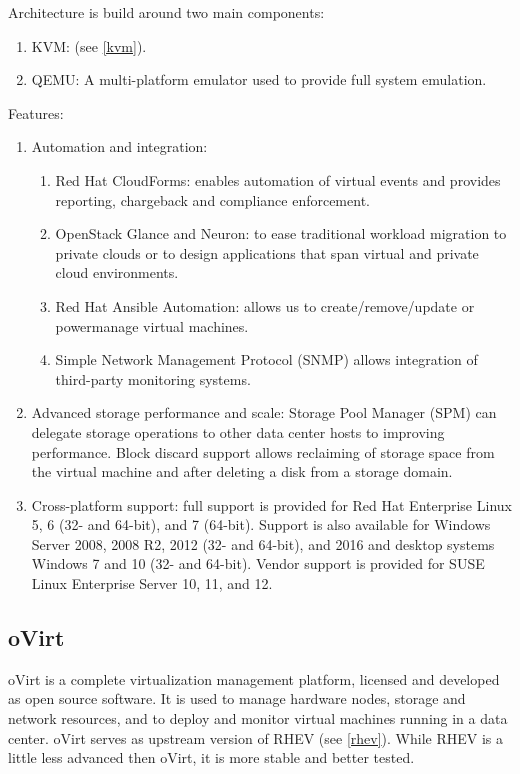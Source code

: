 Architecture is build around two main components:
\begin{enumerate}
\item KVM: (see \ref{kvm}).
\item QEMU: A multi-platform emulator used to provide full system emulation.
\end{enumerate}

Features:
\begin{enumerate}
\item Automation and integration:
\begin{enumerate}
\item Red Hat CloudForms: enables automation of virtual events and provides reporting, chargeback and compliance enforcement.
\item OpenStack Glance and Neuron: to ease traditional workload migration to private clouds or to design applications that span virtual and private cloud environments.
\item Red Hat Ansible Automation: allows us to create/remove/update or powermanage virtual machines.
\item Simple Network Management Protocol (SNMP) allows integration of third-party monitoring systems.
\end{enumerate}
\item Advanced storage performance and scale: Storage Pool Manager (SPM) can delegate storage operations to other data center hosts to improving performance. Block discard support allows reclaiming of storage space from the virtual machine and after deleting a disk from a storage domain.
\item Cross-platform support: full support is provided for Red Hat Enterprise Linux 5, 6 (32- and 64-bit), and 7 (64-bit). Support is also available for Windows Server 2008, 2008 R2, 2012 (32- and 64-bit), and 2016 and desktop systems Windows 7 and 10 (32- and 64-bit). Vendor support is provided for SUSE Linux Enterprise Server 10, 11, and 12.
\end{enumerate}

\subsection{oVirt \cite{ovirt}}
\label{ovirt}
oVirt is a complete virtualization management platform, licensed and developed as open source software. It is used to manage hardware nodes, storage and network resources, and to deploy and monitor virtual machines running in a data center. oVirt serves as upstream version of RHEV (see \ref{rhev}). While RHEV is a little less advanced then oVirt, it is more stable and better tested.


